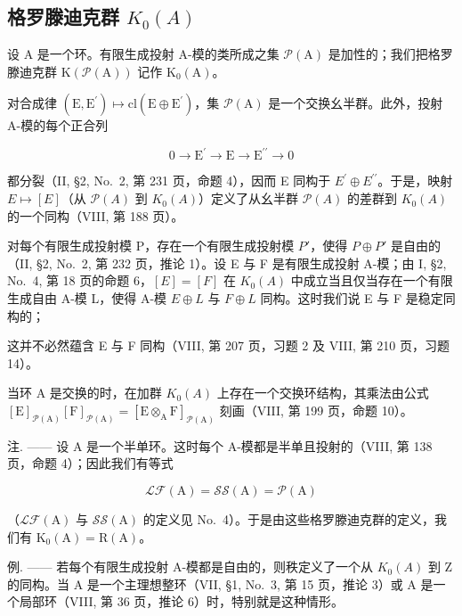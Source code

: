 \subsection{\texorpdfstring{格罗滕迪克群 \(K_{0}(A)\)}{格罗滕迪克群 K\_\{0\}(A)}}

设 \(\mathrm{A}\) 是一个环。有限生成投射 A-模的类所成之集 \(\mathcal{P}(\mathrm{A})\) 是加性的；我们把格罗滕迪克群 \(\mathrm{K}(\mathcal{P}(\mathrm{A}))\) 记作 \(\mathrm{K}_0(\mathrm{A})\)。

对合成律 \((\mathrm{E},\mathrm{E}^{\prime})\mapsto\mathrm{cl}(\mathrm{E}\oplus\mathrm{E}^{\prime})\)，集 \(\mathcal{P}(\mathrm{A})\) 是一个交换幺半群。此外，投射 A-模的每个正合列

\[
0 \longrightarrow \mathrm{E} ^ {\prime} \longrightarrow \mathrm{E} \longrightarrow \mathrm{E} ^ {\prime \prime} \longrightarrow 0
\]

都分裂（II, §2, No.~2, 第 231 页，命题 4），因而 E 同构于 \(E^{\prime} \oplus E^{\prime\prime}\)。于是，映射 \(E \mapsto [E]\)（从 \(\mathcal{P}(A)\) 到 \(K_{0}(A)\)）定义了从幺半群 \(\mathcal{P}(A)\) 的差群到 \(K_{0}(A)\) 的一个同构（VIII, 第 188 页）。

对每个有限生成投射模 P，存在一个有限生成投射模 \(P'\)，使得 \(P \oplus P'\) 是自由的（II, §2, No.~2, 第 232 页，推论 1）。设 E 与 F 是有限生成投射 A-模；由 I, §2, No.~4, 第 18 页的命题 6，\([E] = [F]\) 在 \(K_{0}(A)\) 中成立当且仅当存在一个有限生成自由 A-模 L，使得 A-模 \(E \oplus L\) 与 \(F \oplus L\) 同构。这时我们说 E 与 F 是稳定同构的；

这并不必然蕴含 E 与 F 同构（VIII, 第 207 页，习题 2 及 VIII, 第 210 页，习题 14）。

当环 A 是交换的时，在加群 \(K_{0}(A)\) 上存在一个交换环结构，其乘法由公式 \([\mathrm{E}]_{\mathcal{P}(\mathrm{A})}[\mathrm{F}]_{\mathcal{P}(\mathrm{A})} = [\mathrm{E} \otimes_{\mathrm{A}} \mathrm{F}]_{\mathcal{P}(\mathrm{A})}\) 刻画（VIII, 第 199 页，命题 10）。

注. —— 设 A 是一个半单环。这时每个 A-模都是半单且投射的（VIII, 第 138 页，命题 4）；因此我们有等式

\[
\mathscr {L} \mathscr {F} (\mathrm{A}) = \mathscr {S S} (\mathrm{A}) = \mathscr {P} (\mathrm{A})
\]

（\(\mathcal{LF}(\mathrm{A})\) 与 \(\mathcal{SS}(\mathrm{A})\) 的定义见 No.~4）。于是由这些格罗滕迪克群的定义，我们有 \(\mathrm{K}_0(\mathrm{A}) = \mathrm{R}(\mathrm{A})\)。

例. —— 若每个有限生成投射 A-模都是自由的，则秩定义了一个从 \(K_{0}(A)\) 到 Z 的同构。当 A 是一个主理想整环（VII, §1, No.~3, 第 15 页，推论 3）或 A 是一个局部环（VIII, 第 36 页，推论 6）时，特别就是这种情形。

